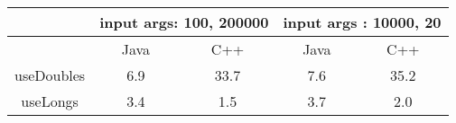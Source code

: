 \begin{tabular}{|c|cc|cc|}
\hline
           & \multicolumn{2}{c|}{input args: 100, 200000} &
\multicolumn{2}{c|}{input args : 10000, 20} \\ \hline
           & Java                 & C++                  & Java
& C++                 \\ \hline
useDoubles & 6.9                  & 33.7                 & 7.6
& 35.2                \\
useLongs   & 3.4                  & 1.5                  & 3.7
& 2.0                 \\ \hline
\end{tabular}
